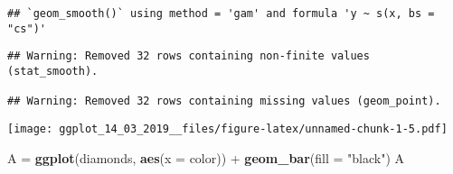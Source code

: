 \documentclass[]{article}
\newenvironment{Shaded}{\begin{snugshade}}{\end{snugshade}}
\newcommand{\KeywordTok}[1]{\textcolor[rgb]{0.13,0.29,0.53}{\textbf{{#1}}}}
\newcommand{\DataTypeTok}[1]{\textcolor[rgb]{0.13,0.29,0.53}{{#1}}}
\newcommand{\DecValTok}[1]{\textcolor[rgb]{0.00,0.00,0.81}{{#1}}}
\newcommand{\StringTok}[1]{\textcolor[rgb]{0.31,0.60,0.02}{{#1}}}
\newcommand{\NormalTok}[1]{{#1}}
\begin{document}
\begin{Shaded}
\end{Shaded}

\begin{verbatim}
## `geom_smooth()` using method = 'gam' and formula 'y ~ s(x, bs = "cs")'
\end{verbatim}

\begin{verbatim}
## Warning: Removed 32 rows containing non-finite values (stat_smooth).

## Warning: Removed 32 rows containing missing values (geom_point).
\end{verbatim}

\texttt{[image: ggplot\_14\_03\_2019\_\_files/figure-latex/unnamed-chunk-1-5.pdf]}

\begin{Shaded}
\begin{Highlighting}[]
\NormalTok{A =}\StringTok{ }\KeywordTok{ggplot}\NormalTok{(diamonds, }\KeywordTok{aes}\NormalTok{(}\DataTypeTok{x =} \NormalTok{color)) +}\StringTok{ }
\StringTok{  }\KeywordTok{geom_bar}\NormalTok{(}\DataTypeTok{fill =} \StringTok{"black"}\NormalTok{)}
\NormalTok{A}
\end{Highlighting}
\end{Shaded}
\end{document}
